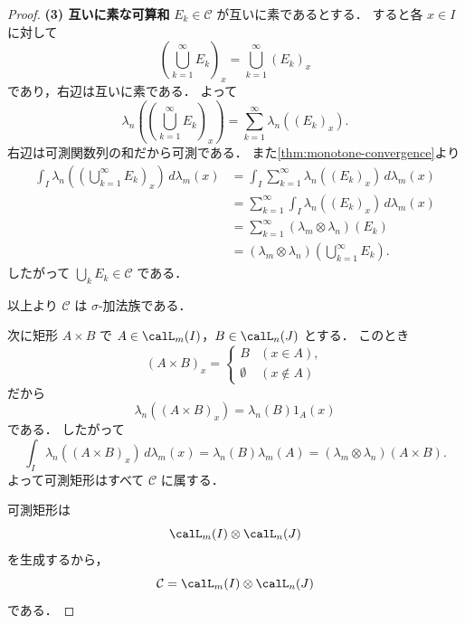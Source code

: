 \begin{proof}
\textbf{(3) 互いに素な可算和}\quad
$E_k\in\mathcal C$ が互いに素であるとする．
すると各 $x\in I$ に対して
\[
\left(\bigcup_{k=1}^{\infty}E_k\right)_x=\bigcup_{k=1}^{\infty}(E_k)_x
\]
であり，右辺は互いに素である．
よって
\[
\lambda_n\left(\left(\bigcup_{k=1}^{\infty}E_k\right)_x\right)
=
\sum_{k=1}^{\infty}\lambda_n((E_k)_x).
\]
右辺は可測関数列の和だから可測である．
また\cref{thm:monotone-convergence}より
\begin{align*}
\int_I \lambda_n\left(\left(\bigcup_{k=1}^{\infty}E_k\right)_x\right)\,d\lambda_m(x)
&=
\int_I \sum_{k=1}^{\infty}\lambda_n((E_k)_x)\,d\lambda_m(x) \\
&=
\sum_{k=1}^{\infty}\int_I \lambda_n((E_k)_x)\,d\lambda_m(x) \\
&=
\sum_{k=1}^{\infty}(\lambda_m\otimes\lambda_n)(E_k) \\
&=
(\lambda_m\otimes\lambda_n)\left(\bigcup_{k=1}^{\infty}E_k\right).
\end{align*}
したがって $\bigcup_k E_k\in\mathcal C$ である．

以上より $\mathcal C$ は $\sigma$-加法族である．

次に矩形 $A\times B$ で
$A\in\calL_m(I)$，$B\in\calL_n(J)$ とする．
このとき
\[
(A\times B)_x
=
\begin{cases}
B & (x\in A),\\
\emptyset & (x\notin A)
\end{cases}
\]
だから
\[
\lambda_n((A\times B)_x)=\lambda_n(B)1_A(x)
\]
である．
したがって
\[
\int_I \lambda_n((A\times B)_x)\,d\lambda_m(x)
=
\lambda_n(B)\lambda_m(A)
=
(\lambda_m\otimes\lambda_n)(A\times B).
\]
よって可測矩形はすべて $\mathcal C$ に属する．

可測矩形は
\[
\calL_m(I)\otimes\calL_n(J)
\]
を生成するから，
\[
\mathcal C=\calL_m(I)\otimes\calL_n(J)
\]
である．
\end{proof}

